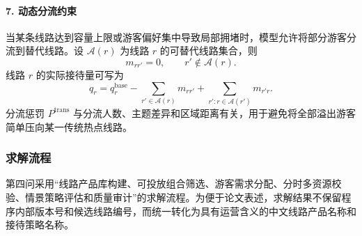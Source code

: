 \documentclass[UTF8,zihao=-4,a4paper]{ctexart}
\begin{document}
\paragraph{7. 动态分流约束}

当某条线路达到容量上限或游客偏好集中导致局部拥堵时，模型允许将部分游客分流到替代线路。设 $\mathcal{A}(r)$ 为线路 $r$ 的可替代线路集合，则
\[
m_{rr'}=0,\qquad r'\notin\mathcal{A}(r).
\]
线路 $r$ 的实际接待量可写为
\[
q_r
=
q_r^{\mathrm{base}}
-
\sum_{r'\in\mathcal{A}(r)}m_{rr'}
+
\sum_{r':r\in\mathcal{A}(r')}m_{r'r}.
\]
分流惩罚 $P^{\mathrm{trans}}$ 与分流人数、主题差异和区域距离有关，用于避免将全部溢出游客简单压向某一传统热点线路。

\subsubsection{求解流程}
\label{subsubsec:q4_solution_process}

第四问采用“线路产品库构建、可投放组合筛选、游客需求分配、分时多资源校验、情景策略评估和质量审计”的求解流程。为便于论文表述，求解结果不保留程序内部版本号和候选线路编号，而统一转化为具有运营含义的中文线路产品名称和接待策略名称。
\end{document}
